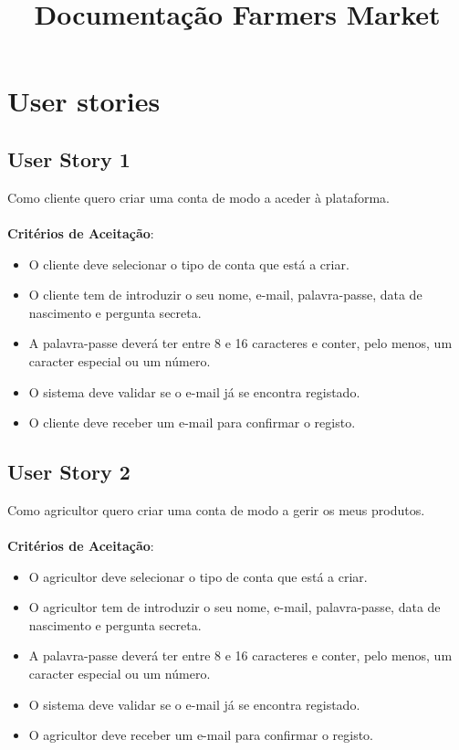 \documentclass[a4paper,11pt]{article}
\title{Documentação Farmers Market}
\author{}
\date{}
\begin{document}
\maketitle
\vspace{-67pt}

\section{User stories}
\subsection{User Story 1}
Como cliente quero criar uma conta de modo a aceder à plataforma.\\\\
\textbf{Critérios de Aceitação}:
\begin{itemize}
  \item O cliente deve selecionar o tipo de conta que está a criar.
  \item O cliente tem de introduzir o seu nome, e-mail, palavra-passe, data de nascimento e pergunta secreta.
  \item A palavra-passe deverá ter entre 8 e 16 caracteres e conter, pelo menos, um caracter especial ou um número.
  \item O sistema deve validar se o e-mail já se encontra registado.
  \item O cliente deve receber um e-mail para confirmar o registo.
\end{itemize}
\subsection{User Story 2}
Como agricultor quero criar uma conta de modo a gerir os meus produtos.\\\\
\textbf{Critérios de Aceitação}:
\begin{itemize}
  \item O agricultor deve selecionar o tipo de conta que está a criar.
  \item O agricultor tem de introduzir o seu nome, e-mail, palavra-passe, data de nascimento e pergunta secreta.
  \item A palavra-passe deverá ter entre 8 e 16 caracteres e conter, pelo menos, um caracter especial ou um número.
  \item O sistema deve validar se o e-mail já se encontra registado.
  \item O agricultor deve receber um e-mail para confirmar o registo.
\end{itemize}
\end{document}
